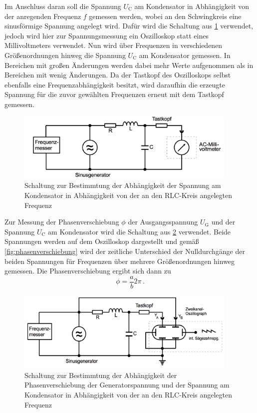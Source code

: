 Im Anschluss daran soll die Spannung $U_{\text{C}}$ am Kondensator in Abhängigkeit
von der anregenden Frequenz $f$ gemessen werden, wobei an den Schwingkreis eine
sinusförmige Spannung angelegt wird. Dafür wird die Schaltung aus \ref{fig:aufbau_3} verwendet,
jedoch wird hier zur Spannungsmessung ein Oszilloskop statt eines Millivoltmeters
verwendet. Nun wird über Frequenzen in verschiedenen Größenordnungen hinweg die
Spannung $U_{\text{C}}$  am Kondensator gemessen. In Bereichen mit großen Änderungen
 werden dabei mehr Werte aufgenommen als in Bereichen mit wenig Änderungen.
Da der Tastkopf des Oszilloskops selbst ebenfalls eine Frequenzabhängigkeit besitzt,
wird daraufhin die erzeugte Spannung für die zuvor gewählten Frequenzen erneut mit
dem Tastkopf gemessen.
\begin{figure}
  \centering
  \includegraphics[width=300pt]{data/aufbau_3.png}
  \caption{Schaltung zur Bestimmtung der Abhängigkeit der Spannung am Kondensator
  in Abhängigkeit von der an den RLC-Kreis angelegten Frequenz\cite{Versuchsanleitung1}}
  \label{fig:aufbau_3}
\end{figure}


Zur Messung der Phasenverschiebung $\phi$ der Ausgangsspannung $U_{\text{G}}$ und
der Spannung $U_{\text{C}}$ am Kondensator wird die Schaltung aus \ref{fig:aufbau_4} verwendet.
Beide Spannungen werden auf dem Oszilloskop dargestellt und gemäß \ref{fig:phasenverschiebung} wird der
zeitliche Unterschied der Nulldurchgänge der beiden Spannungen für Frequenzen
über mehrere Größenordnungen hinweg gemessen. Die Phasenverschiebung ergibt sich
dann zu
\begin{equation}
  \phi=\frac{a}{b}2\pi\,.
  \label{eqn:ab2phi}
\end{equation}

\begin{figure}
  \centering
  \includegraphics[width=300pt]{data/aufbau_4.png}
  \caption{Schaltung zur Bestimmtung der Abhängigkeit der Phasenverschiebung der
  Generatorspannung und der Spannung am Kondensator in Abhängigkeit von der
  an den RLC-Kreis angelegten Frequenz \cite{Versuchsanleitung1}}
  \label{fig:aufbau_4}
\end{figure}

